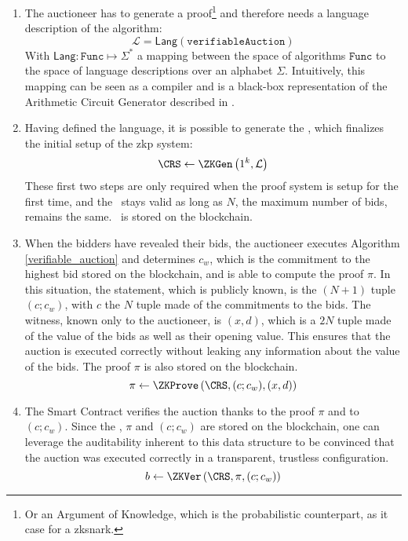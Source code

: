 \begin{enumerate}
    \item The auctioneer has to generate a proof\footnote{Or an Argument of Knowledge, which is the probabilistic counterpart, as it case for a \gls{zksnark}.} and therefore needs a language description of the algorithm:
    \begin{equation*}
        \mathcal{L} = \mathsf{Lang}\left(\mathtt{verifiableAuction}\right)
    \end{equation*}
    With $\mathsf{Lang}:\mathtt{Func}\mapsto \Sigma^*$ a mapping between the space of algorithms $\mathtt{Func}$ to the space of language descriptions over an alphabet $\Sigma$. Intuitively, this mapping can be seen as a compiler and is a black-box representation of the Arithmetic Circuit Generator described in \cite{2014ben-sasson}.
    \item Having defined the language, it is possible to generate the \CRS, which finalizes the initial setup of the \gls{zkp} system:
    \begin{equation*}
        \CRS \leftarrow \ZKGen\left(1^k, \mathcal{L}\right)
    \end{equation*}
    These first two steps are only required when the proof system is setup for the first time, and the \CRS~stays valid as long as $N$, the maximum number of bids, remains the same. \CRS~is stored on the blockchain.
    \item When the bidders have revealed their bids, the auctioneer executes Algorithm \ref{verifiable_auction} and determines $c_w$, which is the commitment to the highest bid stored on the blockchain, and is able to compute the proof $\pi$. In this situation, the statement, which is publicly known, is the $(N+1)$ tuple $(c; c_w)$, with $c$ the $N$ tuple made of the commitments to the bids. The witness, known only to the auctioneer, is $(x, d)$, which is a $2N$ tuple made of the value of the bids as well as their opening value. This ensures that the auction is executed correctly without leaking any information about the value of the bids. The proof $\pi$ is also stored on the blockchain.
    \begin{equation*}
        \pi \gets \ZKProve\left(\CRS, (c; c_w), (x,d)\right)
    \end{equation*}
    \item The Smart Contract verifies the auction thanks to the proof $\pi$ and to $(c; c_w)$. Since the \CRS, $\pi$ and $(c;c_w)$ are stored on the blockchain, one can leverage the auditability inherent to this data structure to be convinced that the auction was executed correctly in a transparent, trustless configuration. 
    \begin{equation*}
        b \gets \ZKVer\left(\CRS, \pi, (c; c_w)\right)
    \end{equation*}
\end{enumerate}